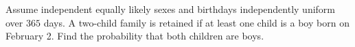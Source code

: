 Assume independent equally likely sexes and birthdays independently uniform over $365$ days. A two-child family is retained if at least one child is a boy born on February 2. Find the probability that both children are boys.
